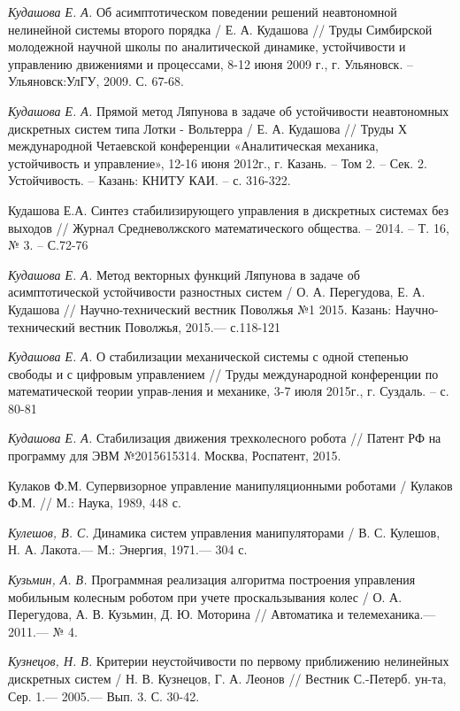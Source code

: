 \begin{thebibliography}{10}
	{\it Кудашова Е. А.} Об асимптотическом поведении решений неавтономной нелинейной системы второго порядка / Е. А. Кудашова //
	Труды Симбирской молодежной научной школы по аналитической динамике, устойчивости и управлению движениями и процессами, 8-12 июня 2009 г., г. Ульяновск. –Ульяновск:УлГУ, 2009. С. 67-68.
	
	{\it Кудашова Е. А.} Прямой метод Ляпунова в задаче об устойчивости неавтономных дискретных систем типа Лотки - Вольтерра / Е. А. Кудашова //
	Труды Х международной Четаевской конференции «Аналитическая механика, устойчивость и управление», 12-16 июня 2012г., г. Казань. – Том 2. – Сек. 2. Устойчивость. – Казань: КНИТУ КАИ. – с. 316-322.
	
	Кудашова Е.А. Синтез стабилизирующего управления в дискретных системах без
	выходов // Журнал Средневолжского математического общества. – 2014. – Т. 16, № 3. – С.72-76
	
	{\it Кудашова Е. А.} Метод векторных функций Ляпунова в задаче об асимптотической устойчивости разностных систем / О. А. Перегудова, Е. А. Кудашова //
	Научно-технический вестник Поволжья №1 2015. Казань: Научно-технический вестник Поволжья, 2015.— с.118-121


{\it Кудашова Е. А.} О стабилизации механической системы с одной степенью свободы и с цифровым управлением // Труды международной конференции по математической теории управ-ления и механике, 3-7 июля 2015г., г. Суздаль. – с. 80-81

{\it Кудашова Е. А.} Стабилизация движения трехколесного робота //  Патент РФ на программу для ЭВМ №2015615314. Москва, Роспатент, 2015. 


	Кулаков Ф.М. Супервизорное управление манипуляционными роботами / Кулаков Ф.М. // М.: Наука, 1989, 448 с.
	
	{\it Кулешов, В. С.} Динамика систем управления манипуляторами / В. С. Кулешов,
	Н. А. Лакота.— М.: Энергия, 1971.— 304 с.
	
	{\it Кузьмин, А. В.} Программная реализация алгоритма построения управления мобильным колесным роботом при учете проскальзывания колес / О. А. Перегудова, А. В. Кузьмин, Д. Ю. Моторина // Автоматика и телемеханика.—  2011.— № 4.
	
	{\it Кузнецов, Н. В.} Критерии неустойчивости по первому приближению нелинейных дискретных систем / Н. В. Кузнецов, Г. А. Леонов // Вестник С.-Петерб. ун-та, Сер. 1.—  2005.— Вып. 3. С. 30-42.
	

\end{thebibliography}
